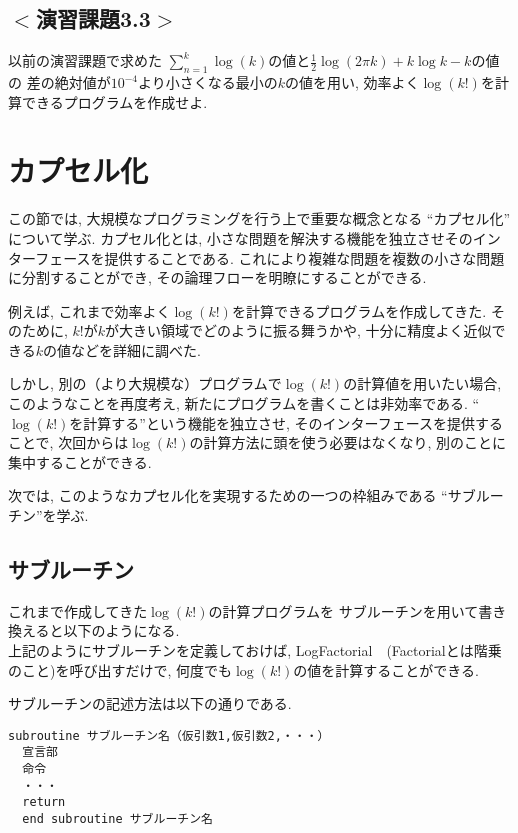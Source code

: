 \subsection*{$<$演習課題3.3$>$}
以前の演習課題で求めた
$\sum_{n=1}^{k}\log(k)$の値と$\frac{1}{2}\log(2\pi k) + k\log{k}-k$の値の
差の絶対値が$10^{-4}$より小さくなる最小の$k$の値を用い,
効率よく$\log(k!)$を計算できるプログラムを作成せよ.



\section{カプセル化}
この節では, 大規模なプログラミングを行う上で重要な概念となる
``カプセル化'' について学ぶ.
カプセル化とは, 小さな問題を解決する機能を独立させそのインターフェースを提供することである.
これにより複雑な問題を複数の小さな問題に分割することができ, その論理フローを明瞭にすることができる.
\newline

例えば, これまで効率よく$\log(k!)$を計算できるプログラムを作成してきた.
そのために, $k!$が$k$が大きい領域でどのように振る舞うかや,
十分に精度よく近似できる$k$の値などを詳細に調べた.

しかし, 別の（より大規模な）プログラムで$\log(k!)$の計算値を用いたい場合,
このようなことを再度考え, 新たにプログラムを書くことは非効率である.
``$\log(k!)$を計算する''という機能を独立させ, そのインターフェースを提供することで,
次回からは$\log(k!)$の計算方法に頭を使う必要はなくなり, 別のことに集中することができる.


次では,
このようなカプセル化を実現するための一つの枠組みである
``サブルーチン''を学ぶ.


\subsection{サブルーチン}
これまで作成してきた$\log(k!)$の計算プログラムを
サブルーチンを用いて書き換えると以下のようになる. \\



上記のようにサブルーチンを定義しておけば, {\ttfamily LogFactorial}　(Factorialとは階乗のこと)を呼び出すだけで,
何度でも$\log(k!)$の値を計算することができる.

サブルーチンの記述方法は以下の通りである.
\begin{Verbatim}[frame=single]
  subroutine サブルーチン名（仮引数1,仮引数2,・・・）
  宣言部
  命令
  ・・・
  return
  end subroutine サブルーチン名
\end{Verbatim}

